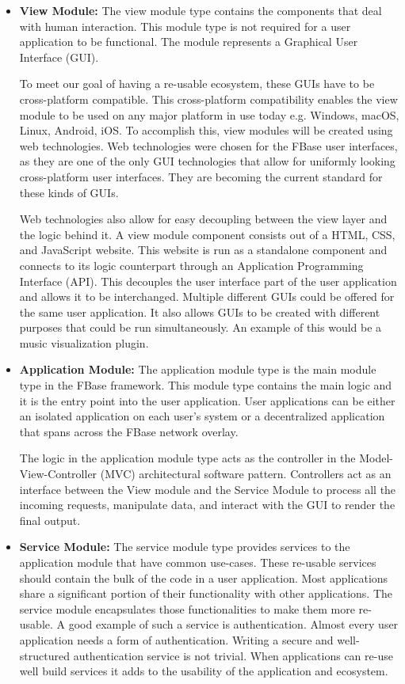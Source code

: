 \begin{itemize}
	\item \textbf{View Module:}
	The view module type contains the components that deal with human interaction. This module type is not required for a user application to be functional. The module represents a Graphical User Interface (GUI). 
	
	To meet our goal of having a re-usable ecosystem, these GUIs have to be cross-platform compatible. This cross-platform compatibility enables the view module to be used on any major platform in use today e.g. Windows, macOS, Linux, Android, iOS. To accomplish this, view modules will be created using web technologies. Web technologies were chosen for the FBase user interfaces, as they are one of the only GUI technologies that allow for uniformly looking cross-platform user interfaces. They are becoming the current standard for these kinds of GUIs.
	
	Web technologies also allow for easy decoupling between the view layer and the logic behind it. A view module component consists out of a HTML, CSS, and JavaScript website. This website is run as a standalone component and connects to its logic counterpart through an Application Programming Interface (API). This decouples the user interface part of the user application and allows it to be interchanged. Multiple different GUIs could be offered for the same user application. It also allows GUIs to be created with different purposes that could be run simultaneously. An example of this would be a music visualization plugin.
	
	\item \textbf{Application Module:}
	The application module type is the main module type in the FBase framework. This module type contains the main logic and it is the entry point into the user application. User applications can be either an isolated application on each user's system or a decentralized application that spans across the FBase network overlay.
	
	The logic in the application module type acts as the controller in the Model-View-Controller (MVC) architectural software pattern. Controllers act as an interface between the View module and the Service Module to process all the incoming requests, manipulate data, and interact with the GUI to render the final output.
	
	\item \textbf{Service Module:}
	The service module type provides services to the application module that have common use-cases. These re-usable services should contain the bulk of the code in a user application. Most applications share a significant portion of their functionality with other applications. The service module encapsulates those functionalities to make them more re-usable. A good example of such a service is authentication. Almost every user application needs a form of authentication. Writing a secure and well-structured authentication service is not trivial. When applications can re-use well build services it adds to the usability of the application and ecosystem.
	

\end{itemize}
